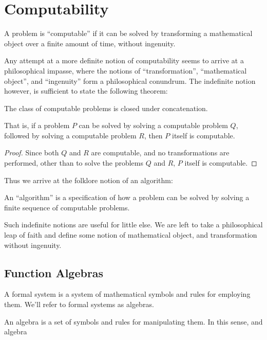 
\chapter{Computability}

\begin{notion} A problem is ``computable'' if it can be solved by transforming
a mathematical object over a finite amount of time, without ingenuity.
\end{notion}

Any attempt at a more definite notion of computability seems to arrive at a
philosophical impasse, where the notions of ``transformation'', ``mathematical
object'', and ``ingenuity'' form a philosophical conundrum. The indefinite
notion however, is sufficient to state the following theorem:

\begin{theorem} The class of computable problems is closed under
concatenation.\end{theorem}

That is, if a problem $P$ can be solved by solving a computable problem $Q$,
followed by solving a computable problem $R$, then $P$ itself is computable.

\begin{proof} Since both $Q$ and $R$ are computable, and no transformations are
performed, other than to solve the problems $Q$ and $R$, $P$ itself is
computable.\end{proof}

Thus we arrive at the folklore notion of an algorithm:

\begin{notion} An ``algorithm'' is a specification of how a problem can be
solved by solving a finite sequence of computable problems.\end{notion}

Such indefinite notions are useful for little else. We are left to take a
philosophical leap of faith and define some notion of mathematical object, and
transformation without ingenuity.

\section{Function Algebras}

A formal system is a system of mathematical symbols and rules for employing
them. We'll refer to formal systems as algebras.

An algebra is a set of symbols and rules for manipulating them. In this sense, and algebra 

